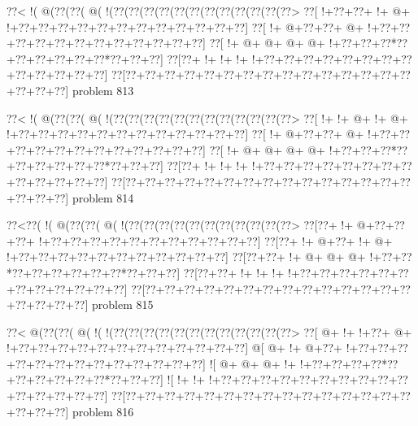 \vbox{\vbox{\goo
\0??<\- !(\- @(\0??(\0??(\- @(\- !(\0??(\0??(\0??(\0??(\0??(\0??(\0??(\0??(\0??(\0??(\0??(\0??>
\0??[\- !+\0??+\0??+\- !+\- @+\- !+\0??+\0??+\0??+\0??+\0??+\0??+\0??+\0??+\0??+\0??+\0??+\0??]
\0??[\- !+\- @+\0??+\0??+\- @+\- !+\0??+\0??+\0??+\0??+\0??+\0??+\0??+\0??+\0??+\0??+\0??+\0??]
\0??[\- !+\- @+\- @+\- @+\- @+\- !+\0??+\0??+\0??*\0??+\0??+\0??+\0??+\0??+\0??*\0??+\0??+\0??]
\0??[\0??+\- !+\- !+\- !+\- !+\0??+\0??+\0??+\0??+\0??+\0??+\0??+\0??+\0??+\0??+\0??+\0??+\0??]
\0??[\0??+\0??+\0??+\0??+\0??+\0??+\0??+\0??+\0??+\0??+\0??+\0??+\0??+\0??+\0??+\0??+\0??+\0??]
}
\hfil problem 813\hfil\break
}



\vbox{\vbox{\goo
\0??<\- !(\- @(\0??(\0??(\- @(\- !(\0??(\0??(\0??(\0??(\0??(\0??(\0??(\0??(\0??(\0??(\0??(\0??>
\0??[\- !+\- !+\- @+\- !+\- @+\- !+\0??+\0??+\0??+\0??+\0??+\0??+\0??+\0??+\0??+\0??+\0??+\0??]
\0??[\- !+\- @+\0??+\0??+\- @+\- !+\0??+\0??+\0??+\0??+\0??+\0??+\0??+\0??+\0??+\0??+\0??+\0??]
\0??[\- !+\- @+\- @+\- @+\- @+\- !+\0??+\0??+\0??*\0??+\0??+\0??+\0??+\0??+\0??*\0??+\0??+\0??]
\0??[\0??+\- !+\- !+\- !+\- !+\0??+\0??+\0??+\0??+\0??+\0??+\0??+\0??+\0??+\0??+\0??+\0??+\0??]
\0??[\0??+\0??+\0??+\0??+\0??+\0??+\0??+\0??+\0??+\0??+\0??+\0??+\0??+\0??+\0??+\0??+\0??+\0??]
}
\hfil problem 814\hfil\break
}



\vbox{\vbox{\goo
\0??<\0??(\- !(\- @(\0??(\0??(\- @(\- !(\0??(\0??(\0??(\0??(\0??(\0??(\0??(\0??(\0??(\0??(\0??>
\0??[\0??+\- !+\- @+\0??+\0??+\0??+\- !+\0??+\0??+\0??+\0??+\0??+\0??+\0??+\0??+\0??+\0??+\0??]
\0??[\0??+\- !+\- @+\0??+\- !+\- @+\- !+\0??+\0??+\0??+\0??+\0??+\0??+\0??+\0??+\0??+\0??+\0??]
\0??[\0??+\0??+\- !+\- @+\- @+\- @+\- !+\0??+\0??*\0??+\0??+\0??+\0??+\0??+\0??*\0??+\0??+\0??]
\0??[\0??+\0??+\- !+\- !+\- !+\- !+\0??+\0??+\0??+\0??+\0??+\0??+\0??+\0??+\0??+\0??+\0??+\0??]
\0??[\0??+\0??+\0??+\0??+\0??+\0??+\0??+\0??+\0??+\0??+\0??+\0??+\0??+\0??+\0??+\0??+\0??+\0??]
}
\hfil problem 815\hfil\break
}



\vbox{\vbox{\goo
\0??<\- @(\0??(\0??(\- @(\- !(\- !(\0??(\0??(\0??(\0??(\0??(\0??(\0??(\0??(\0??(\0??(\0??(\0??>
\0??[\- @+\- !+\- !+\0??+\- @+\- !+\0??+\0??+\0??+\0??+\0??+\0??+\0??+\0??+\0??+\0??+\0??+\0??]
\- @[\- @+\- !+\- @+\0??+\- !+\0??+\0??+\0??+\0??+\0??+\0??+\0??+\0??+\0??+\0??+\0??+\0??+\0??]
\- ![\- @+\- @+\- @+\- !+\- !+\0??+\0??+\0??+\0??*\0??+\0??+\0??+\0??+\0??+\0??*\0??+\0??+\0??]
\- ![\- !+\- !+\- !+\0??+\0??+\0??+\0??+\0??+\0??+\0??+\0??+\0??+\0??+\0??+\0??+\0??+\0??+\0??]
\0??[\0??+\0??+\0??+\0??+\0??+\0??+\0??+\0??+\0??+\0??+\0??+\0??+\0??+\0??+\0??+\0??+\0??+\0??]
}
\hfil problem 816\hfil\break
}



